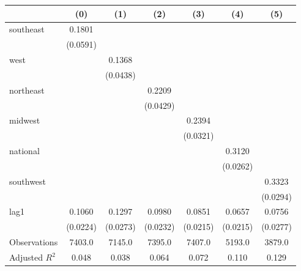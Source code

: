 \begin{tabular}{lcccccc}
\toprule
 & (0) & (1) & (2) & (3) & (4) & (5) \\
\midrule
southeast & 0.1801 &  &  &  &  &  \\
\vspace{0.2cm}
 & (0.0591) &  &  &  &  &  \\
west &  & 0.1368 &  &  &  &  \\
\vspace{0.2cm}
 &  & (0.0438) &  &  &  &  \\
northeast &  &  & 0.2209 &  &  &  \\
\vspace{0.2cm}
 &  &  & (0.0429) &  &  &  \\
midwest &  &  &  & 0.2394 &  &  \\
\vspace{0.2cm}
 &  &  &  & (0.0321) &  &  \\
national &  &  &  &  & 0.3120 &  \\
\vspace{0.2cm}
 &  &  &  &  & (0.0262) &  \\
southwest &  &  &  &  &  & 0.3323 \\
\vspace{0.2cm}
 &  &  &  &  &  & (0.0294) \\
lag1 & 0.1060 & 0.1297 & 0.0980 & 0.0851 & 0.0657 & 0.0756 \\
\vspace{0.2cm}
 & (0.0224) & (0.0273) & (0.0232) & (0.0215) & (0.0215) & (0.0277) \\
\midrule
Observations & 7403.0 & 7145.0 & 7395.0 & 7407.0 & 5193.0 & 3879.0 \\
Adjusted $R^2$ & 0.048 & 0.038 & 0.064 & 0.072 & 0.110 & 0.129 \\
\bottomrule
\end{tabular}